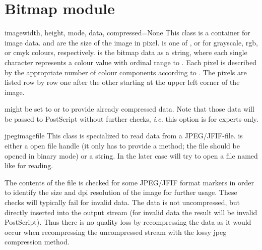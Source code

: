 \section{Bitmap module}

\begin{classdesc}{image}{width, height, mode, data, compressed=None}
  This class is a container for image data.  and
   are the size of the image in pixel.  is one
  of ,  or  for
  grayscale, rgb, or cmyk colours, respectively.  is the
  bitmap data as a string, where each single character represents a
  colour value with ordinal range  to . Each pixel
  is described by the appropriate number of colour components
  according to . The pixels are listed row by row one after
  the other starting at the upper left corner of the image.

   might be set to  or  to
  provide already compressed data. Note that those data will be passed
  to PostScript without further checks, \emph{i.e.} this option is for
  experts only.
\end{classdesc}

\begin{classdesc}{jpegimage}{file}
  This class is specialized to read data from a JPEG/JFIF-file.
   is either a open file handle (it only has to provide a
   method; the file should be opened in binary mode) or
  a string. In the later case  will try to open a
  file named like  for reading.

  The contents of the file is checked for some JPEG/JFIF format
  markers in order to identify the size and dpi resolution of the
  image for further usage. These checks will typically fail for
  invalid data. The data is not uncompressed, but directly inserted
  into the output stream (for invalid data the result will be invalid
  PostScript). Thus there is no quality loss by recompressing the data
  as it would occur when recompressing the uncompressed stream with
  the lossy jpeg compression method.
\end{classdesc}

